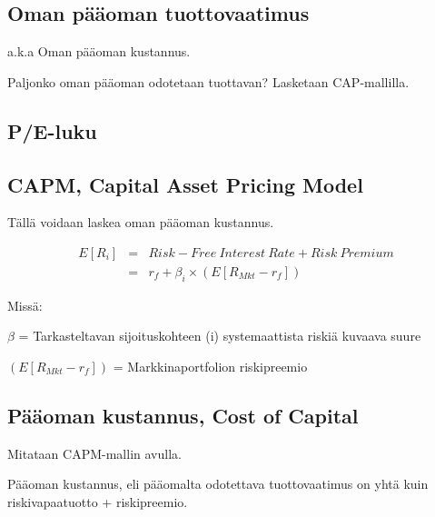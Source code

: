 \documentclass[a4paper]{article}
\begin{document}
\subsection{Oman pääoman tuottovaatimus}

a.k.a Oman pääoman kustannus.

Paljonko oman pääoman odotetaan tuottavan? Lasketaan CAP-mallilla.

\subsection{P/E-luku}

\subsection{CAPM, Capital Asset Pricing Model}

Tällä voidaan laskea oman pääoman kustannus.

\[
\begin{array}{lcl}
E[R_i] & = & Risk-Free\ Interest\ Rate + Risk\ Premium \\
 & = & r_f + \beta_i \times ( E [R_{Mkt} - r_f] )
\end{array}
\]

Missä:

$\beta$ = Tarkasteltavan sijoituskohteen (i) systemaattista riskiä kuvaava suure

$( E [R_{Mkt} - r_f] )$ = Markkinaportfolion riskipreemio

\subsection{Pääoman kustannus, Cost of Capital}

Mitataan CAPM-mallin avulla. 

Pääoman kustannus, eli pääomalta odotettava tuottovaatimus on yhtä kuin riskivapaatuotto + riskipreemio.
\end{document}

